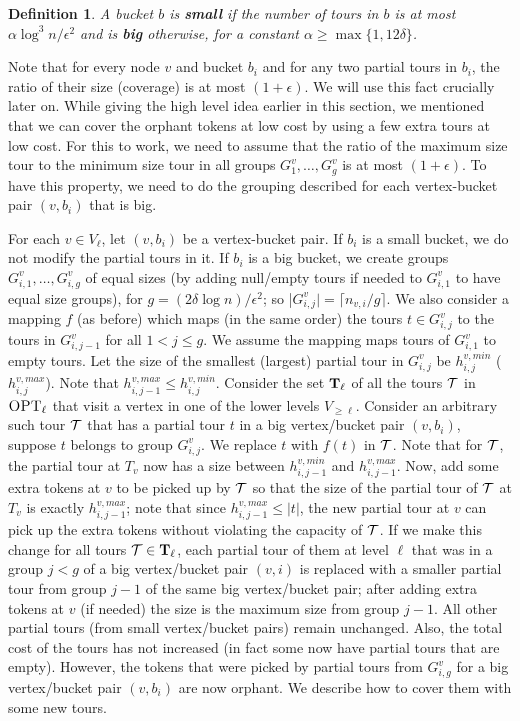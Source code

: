 \documentclass[twoside,leqno]{article}
\newtheorem{definition}{Definition}
\newcommand{\calT}{{\cal T}}
\newcommand{\OPT}{\mbox{\sc OPT}}
\newcommand{\eps}{\epsilon}
\begin{document}
\begin{definition}
A bucket $b$ is \textbf{small} if the number of tours in $b$ is at most $\alpha \log^3 n / \eps^2$ and is \textbf{big} otherwise,
for a constant $\alpha \ge \max\{1, 12\delta\}$.
\end{definition}


Note that for every node $v$ and bucket $b_i$ and for any two partial tours in $b_i$, the ratio of their size (coverage)
is at most $(1 + \eps)$. We will use this fact crucially later on.
While giving the high level idea earlier in this section, we mentioned that we can cover the orphant 
tokens at low cost by using a few extra tours at low cost. For this to work, we need to assume that the ratio of the maximum size tour to the minimum size tour 
in all groups $G^v_1,\ldots,G^v_g$ is at most $(1 + \eps)$. To have this property, 
we need to do the grouping described for each vertex-bucket pair $(v,b_i)$ that is big. 

For each $v \in V_\ell$, let $(v,b_i)$ be a vertex-bucket pair. If $b_i$ is a small bucket, we do not modify the partial tours in it. 
If $b_i$ is a big bucket, we create groups $G^v_{i,1}, \ldots, G^v_{i,g}$ of equal sizes 
(by adding null/empty tours if needed to $G^v_{i,1}$ to have equal size groups), for $g = (2\delta \log n)/\eps^2 $; so 
|$G^v_{i,j}|=\lceil n_{v,i}/g\rceil$. We also consider a mapping $f$ (as before) which maps (in the same order) the 
tours $t\in G^v_{i,j}$ to the tours in $G^v_{i,j-1}$ for all $1<j\leq g$.  We assume the mapping maps tours of $G^v_{i,1}$ to 
empty tours. 
Let the size of the smallest (largest) partial tour in $G^v_{i,j}$ be $h^{v,min}_{i,j}$ ($h^{v,max}_{i,j}$). Note that
$h^{v,max}_{i,j-1}\leq h^{v,min}_{i,j}$.
Consider the set ${\bf T}_\ell$ of all the tours $\calT$ in $\OPT_\ell$ that visit a vertex in one of the lower levels $V_{\geq \ell}$. Consider an arbitrary such tour $\calT$ that has a partial tour $t$ in a big vertex/bucket pair $(v,b_i)$, 
suppose $t$ belongs to group $G^v_{i,j}$. We replace $t$ with $f(t)$ in $\calT$.
Note that for $\calT$, the partial tour at $T_v$ now has a size between 
$h^{v,min}_{i,j-1}$ and $h^{v,max}_{i,j-1}$. Now, add some extra tokens at $v$ to be picked up by $\calT$ so that
the size of the partial tour of $\calT$ at $T_v$ is exactly $h^{v,max}_{i,j-1}$; note that
 since $h^{v,max}_{i,j-1}\leq |t|$, the new partial tour at $v$ can pick up the extra tokens without violating the capacity 
of $\calT$. 
If we make this change for all tours $\calT\in {\bf T}_\ell$, each partial tour of them at level $\ell$ that was in a group
$j<g$ of a big vertex/bucket pair $(v,i)$ is replaced with a smaller partial tour from group $j-1$ of the same big vertex/bucket
pair; after adding extra tokens at $v$ (if needed) the size is the maximum size from group $j-1$. 
All other partial tours (from small vertex/bucket pairs) remain unchanged. Also, the total cost of the tours has not increased (in fact some now have partial tours that are empty). However, the tokens that were picked by
partial tours from $G^v_{i,g}$ for a big vertex/bucket pair $(v,b_i)$ are now orphant. We describe how to cover them with some new tours. 
\end{document}
